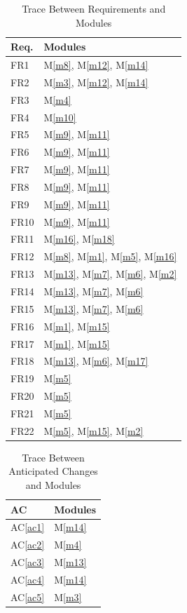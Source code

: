 \documentclass[12pt, titlepage]{article}
\newcommand{\acref}[1]{AC\ref{#1}}
\newcommand{\mref}[1]{M\ref{#1}}
\begin{document}
	\begin{table}[H]
		\centering
		\begin{tabular}{p{} p{}}
			\toprule
			\textbf{Req.} & \textbf{Modules}\\
			\midrule
			FR1 & \mref{m8}, \mref{m12}, \mref{m14}\\
			FR2 & \mref{m3}, \mref{m12}, \mref{m14}\\
			FR3 & \mref{m4}\\
			FR4 & \mref{m10}\\
			FR5 & \mref{m9}, \mref{m11}\\
			FR6 & \mref{m9}, \mref{m11}\\
			FR7 & \mref{m9}, \mref{m11}\\
			FR8 & \mref{m9}, \mref{m11}\\
			FR9 & \mref{m9}, \mref{m11}\\
			FR10 & \mref{m9}, \mref{m11}\\
			FR11 & \mref{m16}, \mref{m18}\\
			FR12 & \mref{m8}, \mref{m1}, \mref{m5}, \mref{m16}\\
			FR13 & \mref{m13}, \mref{m7}, \mref{m6}, \mref{m2}\\
			FR14 & \mref{m13}, \mref{m7}, \mref{m6}\\
			FR15 & \mref{m13}, \mref{m7}, \mref{m6}\\
			FR16 & \mref{m1}, \mref{m15}\\
			FR17 & \mref{m1}, \mref{m15}\\
			FR18 & \mref{m13}, \mref{m6}, \mref{m17}\\
			FR19 & \mref{m5}\\
			FR20 & \mref{m5}\\
			FR21 & \mref{m5}\\
			FR22 & \mref{m5}, \mref{m15}, \mref{m2}\\
			
			\bottomrule
		\end{tabular}
		\caption{Trace Between Requirements and Modules}
		\label{TblRT}
	\end{table}
	
	\begin{table}[H]
		\centering
		\begin{tabular}{p{} p{}}
			\toprule
			\textbf{AC} & \textbf{Modules}\\
			\midrule
			\acref{ac1} & \mref{m14}\\
			\acref{ac2} & \mref{m4}\\
			\acref{ac3} & \mref{m13}\\
			\acref{ac4} & \mref{m14}\\
			\acref{ac5} & \mref{m3}\\
			\bottomrule
		\end{tabular}
		\caption{Trace Between Anticipated Changes and Modules}
		\label{TblACT}
	\end{table}
	
\end{document}
